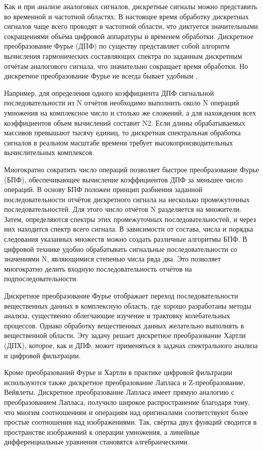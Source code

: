 \documentclass[a4paper, 14pt, titlepage]{extarticle}
\begin{document}
  Как и при анализе аналоговых сигналов, дискретные сигналы можно представить во временной и
  частотной областях. В настоящее время обработку дискретных сигналов чаще всего проводят в
  частотной области, что диктуется значительными сокращениями объёма цифровой аппаратуры и временем
  обработки. Дискретное преобразование Фурье (ДПФ) по существу представляет собой алгоритм вычисления
  гармонических составляющих спектра по заданным дискретным отчётам аналогового сигнала, что
  значительно сокращает время обработки.  Но дискретное преобразование Фурье не всегда бывает
  удобным \cite{solonina-algorithms}.

  Например, для определения одного коэффициента ДПФ сигнальной последовательности из N отчётов
  необходимо выполнить около N операций умножения на комплексное число и столько же сложений, а для
  нахождения всех коэффициентов объем вычислений составит N2. Если длины обрабатываемых массивов
  превышают тысячу единиц, то дискретная спектральная обработка сигналов в реальном масштабе времени
  требует высокопроизводительных вычислительных комплексов.

  Многократно сократить число операций позволяет быстрое преобразование Фурье (БПФ), обеспечивающее
  вычисление коэффициентов ДПФ за меньшее число операций. В основу БПФ положен принцип разбиения
  заданной последовательности отчётов дискретного сигнала на несколько промежуточных
  последовательностей. Для этого число отчётов N разделяется на множители. Затем, определяются
  спектры этих промежуточных последовательностей, и через них находится спектр всего сигнала. В
  зависимости от состава, числа и порядка следования указанных множеств можно создать различные
  алгоритмы БПФ. В цифровой технике удобно обрабатывать сигнальные последовательности со значениями
  N, являющимися степенью числа ряда два. Это позволяет многократно делить входную
  последовательность отчётов на подпоследовательности.

  Дискретное преобразование Фурье отображает переход последовательности вещественных данных в
  комплексную область, где хорошо разработаны методы анализа, существенно облегчающие изучение и
  трактовку колебательных процессов. Однако обработку вещественных данных желательно выполнять в
  вещественной области. Эту задачу решает дискретное преобразование Хартли (ДПХ), которое, как и
  ДПФ, может применяться в задачах спектрального анализа и цифровой фильтрации.

  Кроме преобразований Фурье и Хартли в практике цифровой фильтрации используются также дискретное
  преобразование Лапласа и Z-пре\-об\-ра\-зо\-ва\-ние, Вейвлеты. Дискретное преобразование Лапласа имеет
  прямую аналогию с преобразованием Лапласа, получило широкое распространение благодаря тому, что
  многим соотношениям и операциям над оригиналами соответствуют более простые соотношения над
  изображениями. Так, свёртка двух функций сводится в пространстве изображений к операции умножения,
  а линейные дифференциальные уравнения становятся алгебраическими.
\end{document}
